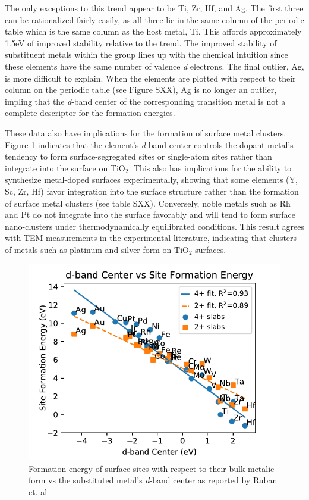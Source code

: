 The only exceptions to this trend appear to be Ti, Zr, Hf, and Ag. The first three can be rationalized fairly easily, as all three lie in the same column of the periodic table which is the same column as the host metal, Ti. This affords approximately 1.5eV of improved stability relative to the trend. The improved stability of substituent metals within the group lines up with the chemical intuition since these elements have the same number of valence \textit{d} electrons. The final outlier, Ag, is more difficult to explain. When the elements are plotted with respect to their column on the periodic table (see Figure SXX), Ag is no longer an outlier, impling that the \textit{d}-band center of the corresponding transition metal is not a complete descriptor for the formation energies.

These data also have implications for the formation of surface metal clusters. Figure \ref{fig:d_band} indicates that the element's \textit{d}-band center controls the dopant metal's tendency to form surface-segregated sites or single-atom sites rather than integrate into the surface on TiO$_2$. This also has implications for the ability to synthesize metal-doped surfaces experimentally, showing that some elements (Y, Sc, Zr, Hf) favor integration into the surface structure rather than the formation of surface metal clusters (see table SXX). Conversely, noble metals such as Rh and Pt do not integrate into the surface favorably and will tend to form surface nano-clusters under thermodynamically equilibrated conditions. This result agrees with TEM measurements in the experimental literature, indicating that clusters of metals such as platinum and silver form on TiO$_2$ surfaces.\cite{Iliev_2006} %

\begin{figure}
    \centering
    \includegraphics[width=0.9\linewidth]{Images/combined_d_band_vs_formation.pdf}
    \caption{Formation energy of surface sites with respect to their bulk metalic form vs the substituted metal's \textit{d}-band center as reported by Ruban et. al \cite{Ruban_1997}}
    \label{fig:d_band}
\end{figure}

